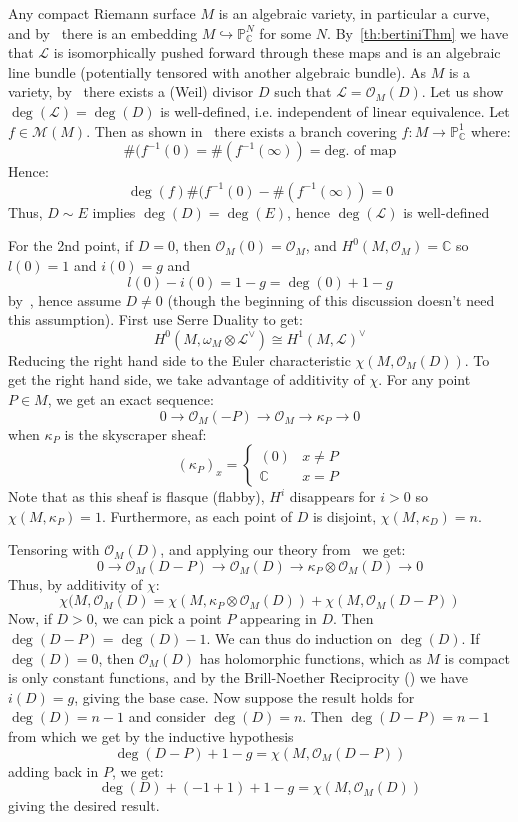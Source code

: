 \documentclass{book}
\newenvironment{Proof}[1][]
  {\begin{ProofTcb}[#1]}
  {\end{ProofTcb}}
\newcommand{\C}{{\mathbb{C}}}
\renewcommand{\P}{{\mathbb{P}}}
\newcommand{\CM}{{\mathcal{M}}}
\newcommand{\CL}{{\mathcal{L}}}
\newcommand{\CO}{{\mathcal{O}}}
\renewcommand{\deg}{{\operatorname{deg}}}
\begin{document}
\begin{Proof}
  Any compact Riemann surface $M$ is an algebraic
  variety, in particular a curve, and by~\cite[section~6.1]{NateAlgGeo} there is an embedding $M
  \hookrightarrow \P_\C^N$ for some $N$. By~\cref{th:bertiniThm} we have
  that $\CL$ is isomorphically pushed forward through these maps and is an algebraic line bundle (potentially
  tensored with another algebraic bundle). As $M$ is
  a variety, by~\cite[section~4.3]{NateAlgGeo} there exists a (Weil) divisor $D$ such that $\CL = \CO_M(D)$.
  Let us show $\deg(\CL) = \deg(D)$ is well-defined, i.e. independent of linear equivalence. Let $f \in
  \CM(M)$. Then as shown in~\cite[section~6.3]{NateComplexAnalysis} there exists a branch covering $f: M \to
  \P_\C^1$ where:
  \[
    \#(f^{-1}(0) = \#(f^{-1}(\infty)) = \text{deg. of map}
  \]
  Hence:
  \[
    \deg(f) \#(f^{-1}(0) - \#(f^{-1}(\infty)) = 0
  \]
  Thus, $D\sim E$ implies $\deg(D) = \deg(E)$, hence $\deg(\CL)$ is well-defined

  For the 2nd point, if $D = 0$, then $\CO_M(0) = \CO_M$, and $H^0(M, \CO_M) = \C$ so $l(0) = 1$ and $i(0) =
  g$ and
  \[
    l(0) - i(0) = 1-g = \deg(0) + 1-g
  \]
  by~\cite[section~6.3]{NateComplexAnalysis}, hence assume $D \ne 0$ (though the beginning of this discussion
  doesn't need this assumption). First use Serre Duality to get:
  \[
    H^0(M, \omega_M\otimes \CL^\vee) \cong H^1(M, \CL)^\vee
  \]
  Reducing the right hand side to the Euler characteristic $\chi(M, \CO_M(D))$. To get the right hand side, we
  take advantage of additivity of $\chi$. For any point $P \in M$, we get an exact sequence:
  \[
    0 \to \CO_M(-P) \to \CO_M \to \kappa_P \to 0
  \]
  when $\kappa_P$ is the skyscraper sheaf:
  \[
    (\kappa_P)_x = \begin{cases}
      (0) & x \ne P\\
      \C & x = P
    \end{cases}
  \]
  Note that as this sheaf is flasque (flabby), $H^i$ disappears for $i > 0$ so $\chi(M, \kappa_P) = 1$. Furthermore, as
  each point of $D$ is disjoint, $\chi(M, \kappa_D) = n$.


  Tensoring with $\CO_M(D)$, and applying our theory from~\cite[section~4.3]{NateAlgGeo} we get:
  \[
    0 \to \CO_M(D-P) \to \CO_M(D) \to \kappa_P \otimes \CO_M(D) \to 0
  \]
  Thus, by additivity of $\chi$:
  \[
    \chi(M, \CO_M(D) = \chi(M, \kappa_P\otimes \CO_M(D)) + \chi(M, \CO_M(D-P))
  \]
  Now, if $D > 0$, we can pick a point $P$ appearing in $D$. Then $\deg(D-P) = \deg(D)-1$. We can thus do
  induction on $\deg(D)$.  If $\deg(D) = 0$, then $\CO_M(D)$ has holomorphic functions, which as $M$ is
  compact is only constant functions, and by the Brill-Noether Reciprocity (\cite{NateComplexAnalysis}) we
  have $i(D) = g$, giving the base case. Now suppose the result holds for $\deg(D) = n-1$ and consider
  $\deg(D) = n$. Then $\deg(D-P) = n-1$ from which we get by the inductive hypothesis
  \[
    \deg(D-P)+1-g = \chi(M, \CO_M(D-P))
  \]
  adding back in $P$, we get:
  \[
    \deg(D)+(-1+1)+1-g = \chi(M, \CO_M(D))
  \]
  giving the desired result.


\end{Proof}
\end{document}
